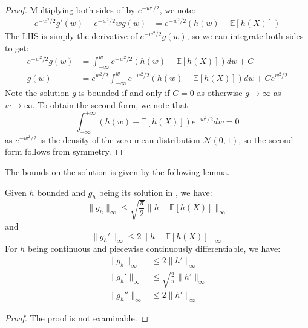 \documentclass{article}
\begin{document}
    \begin{proof}
        Multiplying both sides of  by $e^{-w^2/2}$, we note:
        \begin{align*}
            e^{-w^2/2} g'(w) - e^{-w^2/2}wg(w) &= e^{-w^2/2} (h(w) - \mathbb{E}[h(X)]) 
        \end{align*}
        The LHS is simply the derivative of $e^{-w^2/2}g(w)$, so we can integrate both sides to get:
        \begin{align*}
            e^{-w^2/2}g(w) &= \int_{-\infty}^w e^{-w^2/2} (h(w) - \mathbb{E}[h(X)]) dw +C\\
            g(w) &= e^{w^2/2} \int_{-\infty}^w e^{-w^2/2} (h(w) - \mathbb{E}[h(X)]) dw + Ce^{w^2/2}
        \end{align*}
        Note the solution $g$ is bounded if and only if $C=0$ as otherwise $g\to \infty$ as $w\to \infty$.  
        To obtain the second form, we note that 
        \begin{equation*}
            \int_{-\infty}^{+\infty} (h(w) - \mathbb{E}[h(X)]) e^{-w^2/2} dw = 0
        \end{equation*}
        as $e^{-w^2/2}$ is the density of the zero mean distribution $\mathcal{N}(0,1)$, so the second form follows from symmetry.
    \end{proof}

The bounds on the solution is given by the following lemma.  
\begin{lemma}\label{lem:stein_equation_normal_bound}
    Given $h$ bounded and $g_h$ being its solution in , we have:
    \begin{equation*}
        \|g_h\|_\infty \leq \sqrt{\frac{\pi}{2}} \|h - \mathbb{E}[h(X)]\|_\infty
    \end{equation*}
    and 
    \begin{equation*}
        \|g_h'\|_\infty \leq 2 \|h-\mathbb{E}[h(X)]\|_\infty
    \end{equation*}
    For $h$ being continuous and piecewise continuously differentiable, we have:
    \begin{align*}
        \|g_h\|_\infty &\leq 2 \|h'\|_\infty \\
        \|g_h'\|_\infty &\leq \sqrt{\frac{2}{\pi}} \|h'\|_\infty\\
        \|g_h''\|_\infty &\leq 2 \|h'\|_\infty
    \end{align*}
\end{lemma}
\begin{proof}
    The proof is not examinable.
\end{proof}
\end{document}
